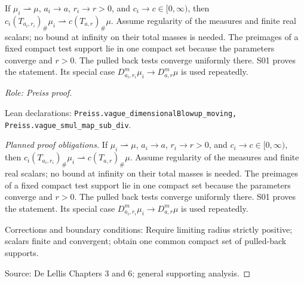 \begin{lemma}
\label{lem:vague-moving-blowups}







If $\mu_i\rightharpoonup\mu$, $a_i\to a$, $r_i\to r>0$, and
$c_i\to c\in[0,\infty)$, then
$c_i(T_{a_i,r_i})_\#\mu_i\rightharpoonup c(T_{a,r})_\#\mu$.
Assume regularity of the measures and finite real scalars; no bound at infinity
on their total masses is needed. The preimages of a fixed compact test support
lie in one compact set because the parameters converge and $r>0$. The pulled
back tests converge uniformly there. S01 proves the statement. Its special case
$D^m_{a_i,r_i}\mu_i\to D^m_{a,r}\mu$ is used repeatedly.
\par\emph{Role: Preiss proof.}
\par Lean declarations: \texttt{Preiss.vague\_dimensionalBlowup\_moving, Preiss.vague\_smul\_map\_sub\_div}.
\end{lemma}
\begin{proof}[Planned proof obligations]

If $\mu_i\rightharpoonup\mu$, $a_i\to a$, $r_i\to r>0$, and
$c_i\to c\in[0,\infty)$, then
$c_i(T_{a_i,r_i})_\#\mu_i\rightharpoonup c(T_{a,r})_\#\mu$.
Assume regularity of the measures and finite real scalars; no bound at infinity
on their total masses is needed. The preimages of a fixed compact test support
lie in one compact set because the parameters converge and $r>0$. The pulled
back tests converge uniformly there. S01 proves the statement. Its special case
$D^m_{a_i,r_i}\mu_i\to D^m_{a,r}\mu$ is used repeatedly.
\par Corrections and boundary conditions: Require limiting radius strictly positive; scalars finite and convergent; obtain one common compact set of pulled-back supports.
\par Source: De Lellis Chapters 3 and 6; general supporting analysis.
\end{proof}

